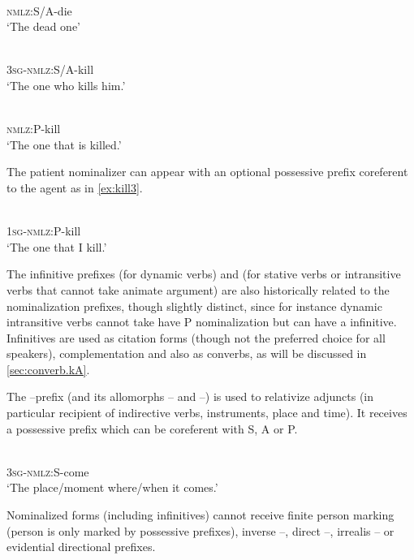  \begin{exe}
\ex \label{ex:die}
\gll {}    \\
  \textsc{nmlz}:S/A-die \\
 \glt  `The dead one'
 
\ex \label{ex:kill}
\gll {}    \\
  \textsc{3sg}-\textsc{nmlz}:S/A-kill \\
 \glt  `The one who kills him.'
 

\ex \label{ex:kill2}
\gll {}    \\
   \textsc{nmlz}:P-kill \\
 \glt  `The one that is killed.'
 \end{exe}
 
  The patient nominalizer  can appear with an optional possessive prefix coreferent to the agent as in \ref{ex:kill3}.
  \begin{exe}
\ex \label{ex:kill3}
\gll {}    \\
   \textsc{1sg-nmlz}:P-kill \\
 \glt  `The one that I kill.'
 \end{exe} 
 
The infinitive prefixes   (for dynamic verbs) and  (for stative verbs or intransitive verbs that cannot take animate argument) are also historically related to the nominalization prefixes, though slightly distinct, since for instance dynamic intransitive verbs cannot take have P nominalization but can have a    infinitive. Infinitives are used as citation forms (though not the preferred choice for all speakers), complementation and also as converbs, as will be discussed in \ref{sec:converb.kA}.
 
 The --prefix (and its allomorphs -- and --) is used to relativize adjuncts (in particular recipient of indirective verbs, instruments, place and time).  It receives a possessive prefix  which can be coreferent with S, A or P.

   \begin{exe}
\ex \label{ex:come}
\gll {}    \\
   \textsc{3sg-nmlz}:S-come \\
 \glt  `The place/moment where/when it comes.'
 \end{exe}

Nominalized forms (including infinitives) cannot receive finite person marking (person is only marked by possessive prefixes), inverse --, direct --, irrealis -- or evidential directional prefixes.

